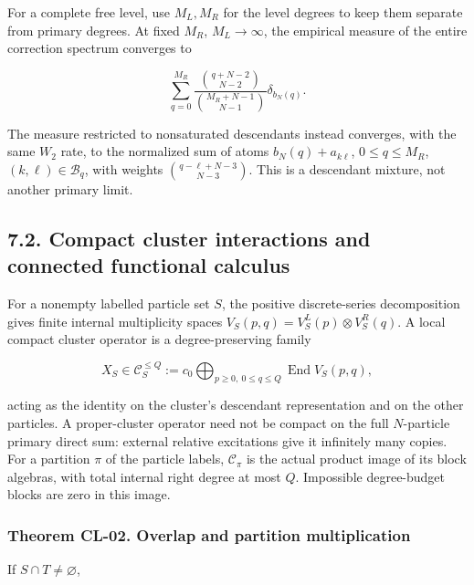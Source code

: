 For a complete free level, use \(M_L,M_R\) for the level degrees to keep them separate from primary degrees. At fixed \(M_R\), \(M_L\to\infty\), the empirical measure of the entire correction spectrum converges to

\[
\sum_{q=0}^{M_R}
\frac{\binom{q+N-2}{N-2}}{\binom{M_R+N-1}{N-1}}
\delta_{b_N(q)}.
\tag{CL.4}
\]

The measure restricted to nonsaturated descendants instead converges, with the same \(W_2\) rate, to the normalized sum of atoms \(b_N(q)+a_{k\ell}\), \(0\leq q\leq M_R\), \((k,\ell)\in\mathcal B_q\), with weights \(\binom{q-\ell+N-3}{N-3}\). This is a descendant mixture, not another primary limit.

\hypertarget{compact-cluster-interactions-and-connected-functional-calculus}{%
\subsection{7.2. Compact cluster interactions and connected functional calculus}\label{compact-cluster-interactions-and-connected-functional-calculus}}

For a nonempty labelled particle set \(S\), the positive discrete-series decomposition gives finite internal multiplicity spaces \(V_S(p,q)=V_S^L(p)\otimes V_S^R(q)\). A local compact cluster operator is a degree-preserving family

\[
X_S\in\mathcal C_S^{\leq Q}:=
 c_0\!\bigoplus_{p\geq0,\ 0\leq q\leq Q}\operatorname{End}V_S(p,q),
\tag{CL.5}
\]

acting as the identity on the cluster's descendant representation and on the other particles. A proper-cluster operator need not be compact on the full \(N\)-particle primary direct sum: external relative excitations give it infinitely many copies. For a partition \(\pi\) of the particle labels, \(\mathcal C_\pi\) is the actual product image of its block algebras, with total internal right degree at most \(Q\). Impossible degree-budget blocks are zero in this image.

\hypertarget{theorem-cl-02.-overlap-and-partition-multiplication}{%
\subsubsection{Theorem CL-02. Overlap and partition multiplication}\label{theorem-cl-02.-overlap-and-partition-multiplication}}

If \(S\cap T\ne\varnothing\),

